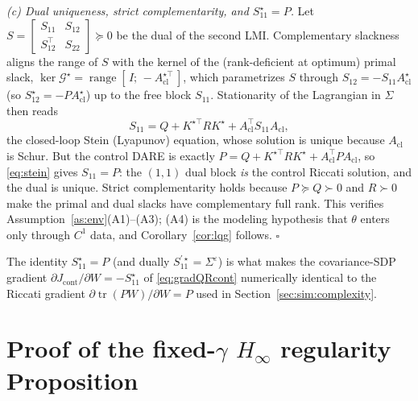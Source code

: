 \documentclass[twocolumn,amsthm]{autart}
\begin{document}
\emph{(c) Dual uniqueness, strict complementarity, and $S_{11}^\star=P$.} Let
$S=\left[\begin{smallmatrix}S_{11}&S_{12}\\S_{12}^\top&S_{22}\end{smallmatrix}
\right]\succeq0$ be the dual of the second LMI. Complementary slackness aligns the
range of $S$ with the kernel of the (rank-deficient at optimum) primal slack,
$\ker\mathcal G^\star=\operatorname{range}[\,I;\,-A_{\mathrm{cl}}^{\star\top}\,]$,
which parametrizes $S$ through $S_{12}=-S_{11}A_{\mathrm{cl}}^\star$ (so
$S_{12}^\star=-PA_{\mathrm{cl}}^\star$) up to the free block
$S_{11}$. Stationarity of the Lagrangian in $\Sigma$ then reads
\begin{equation}\label{eq:stein}
S_{11}=Q+K^{\star\top}RK^\star+A_{\mathrm{cl}}^\top S_{11}A_{\mathrm{cl}},
\end{equation}
the closed-loop Stein (Lyapunov) equation, whose solution is unique because
$A_{\mathrm{cl}}$ is Schur. But the control DARE is exactly $P=Q+
K^{\star\top}RK^\star+A_{\mathrm{cl}}^\top PA_{\mathrm{cl}}$, so \eqref{eq:stein}
gives $S_{11}=P$: the $(1,1)$ dual block \emph{is} the control Riccati solution,
and the dual is unique. Strict complementarity holds because $P\succeq Q\succ0$
and $R\succ0$ make the primal and dual slacks have complementary full rank. This
verifies Assumption~\ref{as:env}(A1)--(A3); (A4) is the modeling hypothesis that
$\theta$ enters only through $C^1$ data, and Corollary~\ref{cor:lqg} follows.
\hfill$\square$

The identity $S_{11}^\star=P$ (and dually $S_{11}^{\prime\star}=
\Sigma^\varepsilon$) is what makes the covariance-SDP gradient
$\partial J_{\mathrm{cont}}/\partial W=-S_{11}^\star$ of \eqref{eq:gradQRcont}
numerically identical to the Riccati gradient $\partial\operatorname{tr}(PW)/
\partial W=P$ used in Section~\ref{sec:sim:complexity}.

\section{Proof of the fixed-$\gamma$ $H_\infty$ regularity Proposition}
\label{app:hinfreg}
\end{document}
